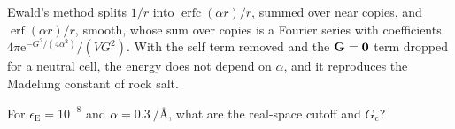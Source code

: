 \begin{keyidea}
Ewald's method splits $1/r$ into $\operatorname{erfc}(\alpha r)/r$, summed
over near copies, and $\operatorname{erf}(\alpha r)/r$, smooth, whose sum
over copies is a Fourier series with coefficients $4\pi\mathrm{e}^{-G^2/
(4\alpha^2)}/(VG^2)$. With the self term removed and the $\bm{\mathrm{G}} =
\bm{\mathrm{0}}$ term dropped for a neutral cell, the energy does not depend on
$\alpha$, and it reproduces the Madelung constant of rock salt.
\end{keyidea}


\begin{selfcheck}
For $\epsilon_{\mathrm E} = 10^{-8}$ and $\alpha = \SI{0.3}{\per\angstrom}$,
what are the real-space cutoff and $G_{\mathrm c}$?
\end{selfcheck}
